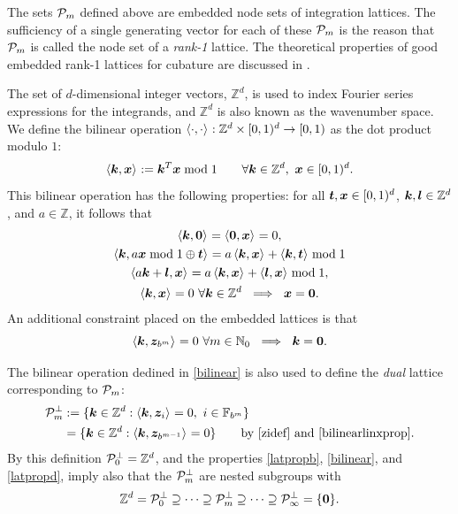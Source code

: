 \documentclass[graybox]{svmult}
\newcommand{\Z}{\mathbb{Z}} %
\newcommand{\N}{\mathbb{N}} %
\newcommand{\F}{\mathbb{F}} %
\newcommand{\bszero}{\boldsymbol{0}} %
\newcommand{\bst}{\boldsymbol{t}}    %
\newcommand{\bsx}{\boldsymbol{x}}    %
\newcommand{\bsz}{\boldsymbol{z}}    %
\begin{document}
The sets $\mathcal{P}_m$ defined above are embedded node sets of integration lattices. The sufficiency of a single generating vector for each of these $\mathcal{P}_m$ is the reason that $\mathcal{P}_m$ is called the node set of a \emph{rank-1} lattice. 
The theoretical properties of good embedded rank-1 lattices for cubature are discussed in \cite{HicNie03a}.  
 
The set of $d$-dimensional integer vectors, $\Z^d$, is used to index Fourier series expressions for the integrands, and $\Z^d$ is also known as the wavenumber space. We define the bilinear operation $\ip{\cdot}{\cdot}: \Z^d \times \cube \to [0,1)$ as the dot product modulo $1$: 
\begin{equation}\label{bilinear}
\ip{\bsk}{\bsx}:=\bsk^T\bsx\bmod 1 \qquad \forall \bsk \in \Z^d, \ \bsx \in \cube.
\end{equation}
This bilinear operation has the following properties: for all $\bst, \bsx \in \cube$, $\bsk, \bsl \in \Z^d$, and $a \in \Z$, it follows that
\begin{subequations}
\begin{gather}
\ip{\bsk}{\bszero} = \ip{\bszero}{\bsx} = 0,\\
\ip{\bsk}{a \bsx \bmod 1 \oplus \bst} = a\ip{\bsk}{\bsx} + \ip{\bsk}{\bst} \bmod 1 \label{bilinearlinxprop} \\
\ip{a \bsk + \bsl}{\bsx} = a\ip{\bsk}{\bsx} + \ip{\bsl}{\bsx} \bmod 1, \label{bilinearlinkprop}\\
\ip{\bsk}{\bsx} = 0 \ \forall \bsk \in \Z^d \ \implies \ \bsx=\bszero.\label{bilinearlinzeroprop}
\end{gather}
\end{subequations}
An additional constraint placed on the embedded lattices is that
\begin{equation}
\ip{\bsk}{\bsz_{b^m}} =  0 \ \forall m \in \N_0   \ \implies \ \bsk=\bszero. \label{latpropd}
\end{equation}

The bilinear operation dedined in \eqref{bilinear} is also used to define the \emph{dual} lattice corresponding to $\mathcal{P}_m$:
\begin{align}
\nonumber
\cp^{\perp}_m & := \{\bsk \in \Z^d : \ip{\bsk}{\bsz_i} = 0, \ i\in \F_{b^m}\} \\
&= \{\bsk \in \Z^d : \ip{\bsk}{\bsz_{b^{m-1}}} = 0 \} \qquad \text{by \eqref{zidef} and \eqref{bilinearlinxprop}} .\label{dualdef}
\end{align}
By this definition $\cp^{\perp}_{0}=\Z^d$, and the properties \eqref{latpropb}, \eqref{bilinear}, and \eqref{latpropd}, imply also that the $\mathcal{P}^{\perp}_m$ are nested subgroups with
\begin{equation}\label{dualemb}
\Z^d=\cp^{\perp}_{0}\supseteq\dots\supseteq\cp^{\perp}_{m}\supseteq\dots\supseteq\cp^{\perp}_{\infty}=\{\bszero\}.
\end{equation}
\end{document}
